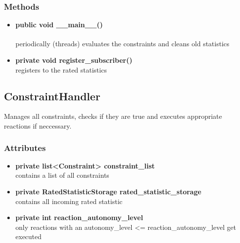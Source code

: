 \subsubsection{Methods}
\begin{itemize}
	\item \textbf{ public void \_\_main\_\_() }\\\\
		periodically (threads) evaluates the constraints and cleans old statistics
	\item \textbf{ private void register\_subscriber() }\\
		registers to the rated statistics
\end{itemize}



\subsection{ConstraintHandler}
Manages all constraints, checks if they are true and executes appropriate reactions if neccessary.

\subsubsection{Attributes}
\begin{itemize}
	\item \textbf{ private list<Constraint> constraint\_list }\\
		contains a list of all constraints
	\item \textbf{ private  RatedStatisticStorage rated\_statistic\_storage }\\
		contains all incoming rated statistic
	\item \textbf{ private  int reaction\_autonomy\_level }\\
		only reactions with an autonomy\_level <= reaction\_autonomy\_level get executed
\end{itemize}
